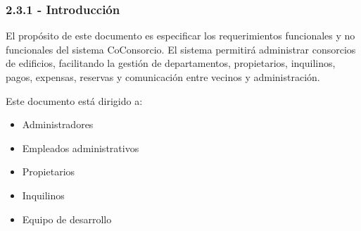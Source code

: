 \subsubsection{2.3.1 - Introducción}

El propósito de este documento es especificar los requerimientos funcionales y no funcionales del sistema CoConsorcio.  
El sistema permitirá administrar consorcios de edificios, facilitando la gestión de departamentos, propietarios, inquilinos, pagos, expensas, reservas y comunicación entre vecinos y administración.  

Este documento está dirigido a:
\begin{itemize}
    \item Administradores   
    \item Empleados administrativos   
    \item Propietarios   
    \item Inquilinos   
    \item Equipo de desarrollo
\end{itemize}

